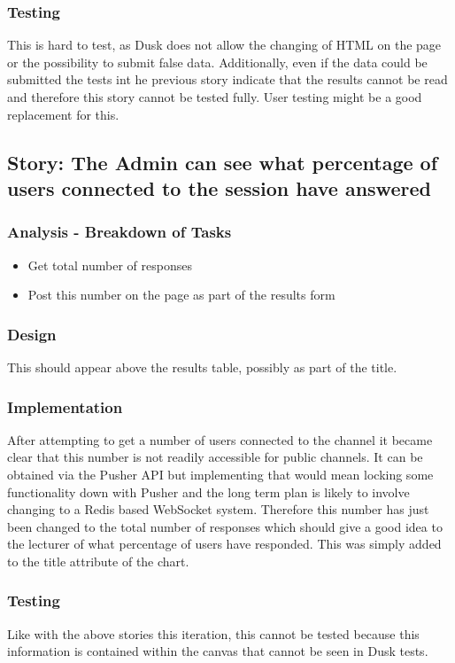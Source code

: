 \subsubsection{Testing}
This is hard to test, as Dusk does not allow the changing of HTML on the page or the possibility to submit false data. Additionally, even if the data could be submitted the tests int he previous story indicate that the results cannot be read and therefore this story cannot be tested fully. User testing might be a good replacement for this.
\newpage

\subsection{Story: The Admin can see what percentage of users connected to the session have answered}
\subsubsection{Analysis - Breakdown of Tasks}
\begin{itemize}
	\item Get total number of responses
	\item Post this number on the page as part of the results form
\end{itemize}
\subsubsection{Design}
This should appear above the results table, possibly as part of the title.
\subsubsection{Implementation}
After attempting to get a number of users connected to the channel it became clear that this number is not readily accessible for public channels. It can be obtained via the Pusher API but implementing that would mean locking some functionality down with Pusher and the long term plan is likely to involve changing to a Redis based WebSocket system. Therefore this number has just been changed to the total number of responses which should give a good idea to the lecturer of what percentage of users have responded. This was simply added to the title attribute of the chart.
\subsubsection{Testing}
Like with the above stories this iteration, this cannot be tested because this information is contained within the canvas that cannot be seen in Dusk tests.
\newpage
